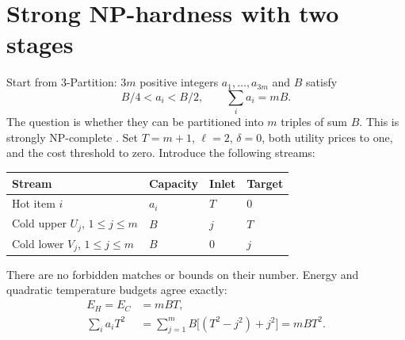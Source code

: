 \documentclass[11pt,a4paper]{report}
\begin{document}
\section{Strong NP-hardness with two stages}
Start from 3-Partition: $3m$ positive integers $a_1,\ldots,a_{3m}$ and $B$
satisfy
\begin{equation}\label{eq:3p}
 B/4<a_i<B/2,\qquad \sum_i a_i=mB.
\end{equation}
The question is whether they can be partitioned into $m$ triples of sum $B$.
This is strongly NP-complete \autocite{GareyJohnson}.
Set $T=m+1$, $\ell=2$, $\delta=0$, both utility prices to one, and the cost
threshold to zero. Introduce the following streams:
\begin{center}
\begin{tabular}{llll}
\hline
Stream & Capacity & Inlet & Target\\
\hline
Hot item $i$ & $a_i$ & $T$ & $0$\\
Cold upper $U_j$, $1\leq j\leq m$ & $B$ & $j$ & $T$\\
Cold lower $V_j$, $1\leq j\leq m$ & $B$ & $0$ & $j$\\
\hline
\end{tabular}
\end{center}
There are no forbidden matches or bounds on their number. Energy and
quadratic temperature budgets agree exactly:
\begin{align}
 E_H=E_C&=mBT,\label{eq:equalenergy}\\
 \sum_i a_iT^2&=\sum_{j=1}^m B\bigl[(T^2-j^2)+j^2\bigr]=mBT^2.
 \label{eq:equalsquare}
\end{align}
\end{document}
